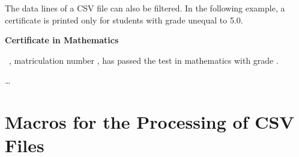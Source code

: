 \documentclass[a4paper,11pt]{ltxdoc}
\begin{document}
\clearpage
The data lines of a CSV file can also be filtered. In the following example,
a certificate is printed only for students with grade unequal to 5.0.

\begin{dispExample}
%
  {\begin{center}\Large\bfseries Certificate in Mathematics\end{center}
  \large{}
  \firstname~\name, matriculation number \matnumber, has passed the test
  in mathematics with grade \grade.\par\ldots\par
  }%
\end{dispExample}


\clearpage
\section{Macros for the Processing of CSV Files}\label{sec:makros}%
\end{document}
